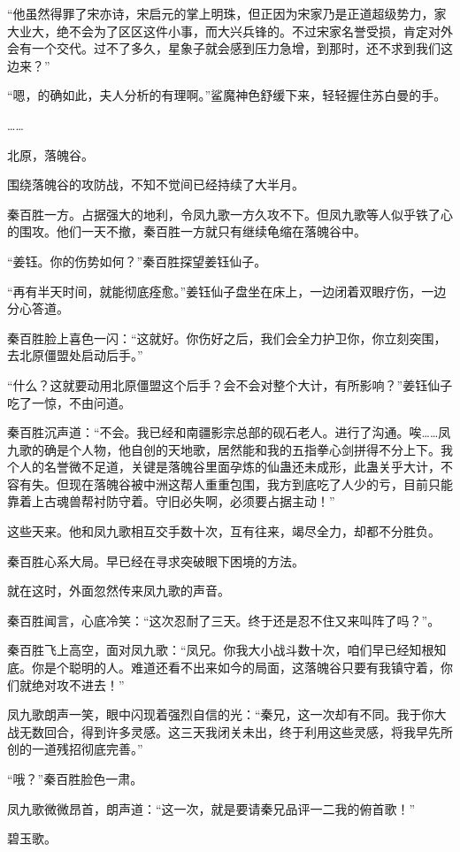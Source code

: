 \begin{this_body}
“他虽然得罪了宋亦诗，宋启元的掌上明珠，但正因为宋家乃是正道超级势力，家大业大，绝不会为了区区这件小事，而大兴兵锋的。不过宋家名誉受损，肯定对外会有一个交代。过不了多久，星象子就会感到压力急增，到那时，还不求到我们这边来？”

“嗯，的确如此，夫人分析的有理啊。”鲨魔神色舒缓下来，轻轻握住苏白曼的手。

……

北原，落魄谷。

围绕落魄谷的攻防战，不知不觉间已经持续了大半月。

秦百胜一方。占据强大的地利，令凤九歌一方久攻不下。但凤九歌等人似乎铁了心的围攻。他们一天不撤，秦百胜一方就只有继续龟缩在落魄谷中。

“姜钰。你的伤势如何？”秦百胜探望姜钰仙子。

“再有半天时间，就能彻底痊愈。”姜钰仙子盘坐在床上，一边闭着双眼疗伤，一边分心答道。

秦百胜脸上喜色一闪：“这就好。你伤好之后，我们会全力护卫你，你立刻突围，去北原僵盟处启动后手。”

“什么？这就要动用北原僵盟这个后手？会不会对整个大计，有所影响？”姜钰仙子吃了一惊，不由问道。

秦百胜沉声道：“不会。我已经和南疆影宗总部的砚石老人。进行了沟通。唉……凤九歌的确是个人物，他自创的天地歌，居然能和我的五指拳心剑拼得不分上下。我个人的名誉微不足道，关键是落魄谷里面孕炼的仙蛊还未成形，此蛊关乎大计，不容有失。但现在落魄谷被中洲这帮人重重包围，我方到底吃了人少的亏，目前只能靠着上古魂兽帮衬防守着。守旧必失啊，必须要占据主动！”

这些天来。他和凤九歌相互交手数十次，互有往来，竭尽全力，却都不分胜负。

秦百胜心系大局。早已经在寻求突破眼下困境的方法。

就在这时，外面忽然传来凤九歌的声音。

秦百胜闻言，心底冷笑：“这次忍耐了三天。终于还是忍不住又来叫阵了吗？”。

秦百胜飞上高空，面对凤九歌：“凤兄。你我大小战斗数十次，咱们早已经知根知底。你是个聪明的人。难道还看不出来如今的局面，这落魄谷只要有我镇守着，你们就绝对攻不进去！”

凤九歌朗声一笑，眼中闪现着强烈自信的光：“秦兄，这一次却有不同。我于你大战无数回合，得到许多灵感。这三天我闭关未出，终于利用这些灵感，将我早先所创的一道残招彻底完善。”

“哦？”秦百胜脸色一肃。

凤九歌微微昂首，朗声道：“这一次，就是要请秦兄品评一二我的俯首歌！”

碧玉歌。


\end{this_body}
